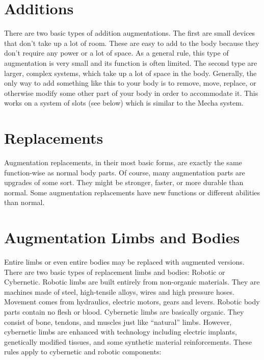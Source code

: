 \documentclass[twoside]{book}
\begin{document}
\section{Additions}
     There are two basic types of addition augmentations.
             The first are small devices that don’t take up a lot
             of room. These are easy to add to the body because they
             don’t require any power or a lot of space. As a
             general rule, this type of augmentation is very small and
             its function is often limited.  The second type are larger, complex systems, which
             take up a lot of space in the body. Generally, the only way
             to add something like this to your body is to remove, move,
             replace, or otherwise modify some other part of your body in
             order to accommodate it. This works on a system of slots
             (see below) which is similar to the Mecha system. 
\section{Replacements}
     Augmentation replacements, in their most basic forms,
             are exactly the same function-wise as normal body parts. Of
             course, many augmentation parts are upgrades of some sort.
             They might be stronger, faster, or more durable than normal.
             Some augmentation replacements have new functions or
             different abilities than normal. 
\section{Augmentation Limbs and Bodies}
     Entire limbs or even entire bodies may be replaced
             with augmented versions. There are two basic types of
             replacement limbs and bodies: Robotic or Cybernetic.  Robotic limbs are built entirely from non-organic
             materials. They are machines made of steel, high-tensile
             alloys, wires and high pressure hoses. Movement comes from
             hydraulics, electric motors, gears and levers. Robotic body
             parts contain no flesh or blood.  Cybernetic limbs are basically organic. They consist
             of bone, tendons, and muscles just like
             “natural” limbs. However, cybernetic limbs are
             enhanced with technology including electric implants,
             genetically modified tissues, and some synthetic material
             reinforcements.  These rules apply to cybernetic and robotic
             components: 
\end{document}
